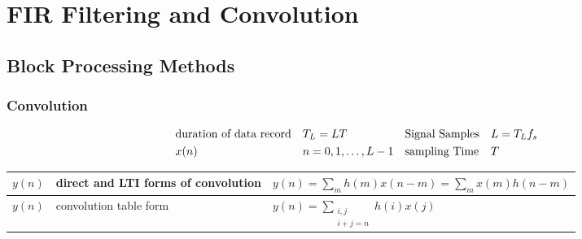 \section{FIR Filtering and Convolution}
\subsection{Block Processing Methods}
\subsubsection{Convolution}

\begin{align}
& \text{duration of data record} && T_L=LT && \text{Signal Samples} && L=T_Lf_s \notag \\
& x(n) && n=0,1,\ldots,L-1 && \text{sampling Time} && T \notag
\end{align}

\begin{tabular}{|l|l|l|}
	\hline
	$y(n)$		& direct and LTI forms of convolution	& $y(n)=\sum\limits_m h(m)x(n-m)=\sum\limits_m x(m)h(n-m)$
	\\ \hline
	$y(n)$		& convolution table form				& $y(n)=\sum\limits_{\substack{i,j \\ i+j=n}} h(i)x(j)$
	\\ \hline
\end{tabular}

